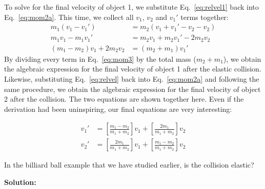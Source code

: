 To solve for the final velocity of object 1, we substitute Eq.~\ref{eq:relvel1}
back into Eq.~\ref{eq:mom2a}. This time, we collect all $v_1$, $v_2$ and $v_1'$
terms together:
\begin{align}
  \nonumber
  m_1(v_1-v_1')&=m_2(v_1+v_1'-v_2-v_2)\\
  \nonumber
  m_1v_1-m_1v_1'&=m_2v_1+m_2v_1'-2m_2v_2\\
  (m_1-m_2)v_1+2m_2v_2&=(m_2+m_1)v_1'
  \label{eq:mom3}
\end{align}
By dividing every term in Eq.~\ref{eq:mom3} by the total mass ($m_2+m_1$), we 
obtain the algebraic expression for the final velocity of object 1 after the
elastic collision. Likewise, substituting Eq.~\ref{eq:relvel} back into
Eq.~\ref{eq:mom2a} and following the same procedure, we obtain the algebraic
expression for the final velocity of object 2 after the collision. The two
equations are shown together here.  Even if the derivation had been
uninspiring, our final equations are very interesting:
\begin{eqBox}
  \begin{align}
    v_1' &=
    \left[\frac{m_1-m_2}{m_1+m_2}\right]v_1 +
    \left[\frac{2m_1}{m_1+m_2}\right]v_2    \label{eq:mom4}\\
    v_2' &=
    \left[\frac{2m_1}{m_1+m_2}\right]v_1 +
    \left[\frac{m_1-m_2}{m_1+m_2}\right]v_2     \label{eq:mom5}
  \end{align}
\end{eqBox}


\begin{example}
  In the billiard ball example that we have studied earlier, is the collision
  elastic?

  \textbf{Solution:}
\end{example}



